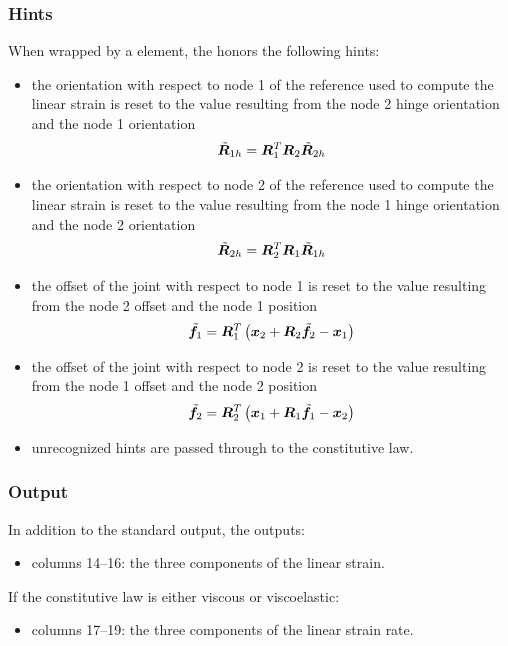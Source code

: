 \subsubsection{Hints}
When wrapped by a  element, the 
honors the following hints:
\begin{itemize}
\item {} the orientation with respect to node 1
of the reference used to compute the linear strain is reset
to the value resulting from the node 2 hinge orientation
and the node 1 orientation
\begin{displaymath}
	\tilde{\boldsymbol{R}}_{1h} = \boldsymbol{R}_1^T \boldsymbol{R}_2 \tilde{\boldsymbol{R}}_{2h}
\end{displaymath}
\item {} the orientation with respect to node 2
of the reference used to compute the linear strain is reset
to the value resulting from the node 1 hinge orientation
and the node 2 orientation
\begin{displaymath}
	\tilde{\boldsymbol{R}}_{2h} = \boldsymbol{R}_2^T \boldsymbol{R}_1 \tilde{\boldsymbol{R}}_{1h}
\end{displaymath}
\item {} the offset of the joint
with respect to node 1 is reset to the value resulting 
from the node 2 offset and the node 1 position
\begin{displaymath}
	\tilde{\boldsymbol{f}}_1 = \boldsymbol{R}_1^T \left( 
		\boldsymbol{x}_2
		+ \boldsymbol{R}_2 \tilde{\boldsymbol{f}}_2
		- \boldsymbol{x}_1
	 \right)
\end{displaymath}
\item {} the offset of the joint
with respect to node 2 is reset to the value resulting 
from the node 1 offset and the node 2 position
\begin{displaymath}
	\tilde{\boldsymbol{f}}_2 = \boldsymbol{R}_2^T \left( 
		\boldsymbol{x}_1
		+ \boldsymbol{R}_1 \tilde{\boldsymbol{f}}_1
		- \boldsymbol{x}_2
	 \right)
\end{displaymath}
\item unrecognized hints are passed through to the constitutive law.
\end{itemize}

\subsubsection{Output}
In addition to the standard output, the 
outputs:
\begin{itemize}
\item columns 14--16: the three components of the linear strain.
\end{itemize}
If the constitutive law is either viscous or viscoelastic:
\begin{itemize}
\item columns 17--19: the three components of the linear strain rate.
\end{itemize}



